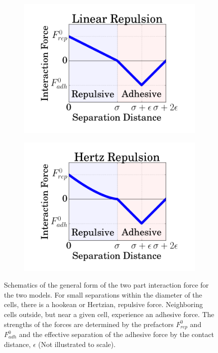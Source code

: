 \documentclass[aps,prb,twocolumn,groupedaddress,nofootinbib,floatfix]{revtex4}
\begin{document}
\begin{figure}
  \begin{subfigure}{\columnwidth}
    \includegraphics[width=1.0\columnwidth]{images/interaction.png}
  \end{subfigure}
  \begin{subfigure}{\columnwidth}
    \includegraphics[width=1.0\columnwidth]{images/hertz.png}
  \end{subfigure}
  \caption[capsuleECM]{Schematics of the general form of the two part interaction force for the two models. For small separations within the diameter of the cells, there is a hookean or Hertzian, repulsive force. Neighboring cells outside, but near a given cell, experience an adhesive force. The strengths of the forces are determined by the prefactors $F_{rep}^0$ and $F_{adh}^0$ and the effective separation of the adhesive force by the contact distance, $\epsilon$  (Not illustrated to scale).}
  \label{fig:interaction}
\end{figure}
\end{document}
